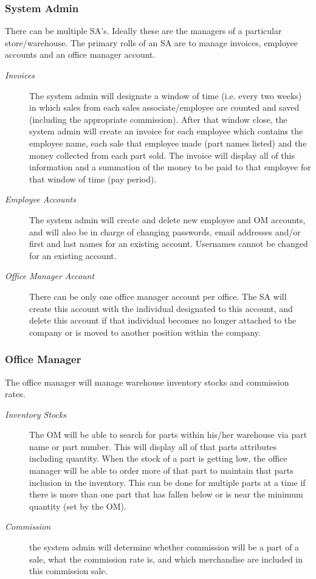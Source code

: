 \documentclass{report}
\begin{document}
\subsubsection{System Admin}
There can be multiple SA’s. Ideally these are the managers of a particular store/warehouse. The primary rolls of an SA are to manage invoices, employee accounts and an office manager account.\par
\begin{description}
  \item[\textit{Invoices}] The system admin will designate a window of time (i.e. every two weeks) in which sales from each sales associate/employee are counted and saved (including the appropriate commission). After that window close, the system admin will create an invoice for each employee which contains the employee name, each sale that employee made (part names listed) and the money collected from each part sold. The invoice will display all of this information and a summation of the money to be paid to that employee for that window of time (pay period).
  \item[\textit{Employee Accounts}] The system admin will create and delete new employee and OM accounts, and will also be in charge of changing passwords, email addresses and/or first and last names for an existing account. Usernames cannot be changed for an existing account.\par
  \item[\textit{Office Manager Account}] There can be only one office manager account per office. The SA will create this account with the individual designated to this account, and delete this account if that individual becomes no longer attached to the company or is moved to another position within the company.\par
\end{description}
\subsubsection{Office Manager}
The office manager will manage warehouse inventory stocks and commission rates.\par
\begin{description}
  \item[\textit{Inventory Stocks}] The OM will be able to search for parts within his/her warehouse via part name or part number. This will display all of that parts attributes including quantity. When the stock of a part is getting low, the office manager will be able to order more of that part to maintain that parts inclusion in the inventory. This can be done for multiple parts at a time if there is more than one part that has fallen below or is near the minimum quantity (set by the OM).\par
  \item[\textit{Commission}] the system admin will determine whether commission will be a part of a sale, what the commission rate is, and which merchandise are included in this commission sale.\par
\end{description}
\end{document}
